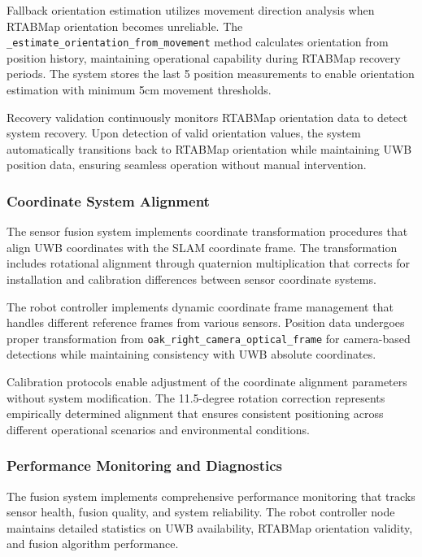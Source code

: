 Fallback orientation estimation utilizes movement direction analysis when RTABMap orientation becomes unreliable. The \texttt{\_estimate\_orientation\_from\_movement} method calculates orientation from position history, maintaining operational capability during RTABMap recovery periods. The system stores the last 5 position measurements to enable orientation estimation with minimum 5cm movement thresholds.

Recovery validation continuously monitors RTABMap orientation data to detect system recovery. Upon detection of valid orientation values, the system automatically transitions back to RTABMap orientation while maintaining UWB position data, ensuring seamless operation without manual intervention.

\subsubsection{Coordinate System Alignment}

The sensor fusion system implements coordinate transformation procedures that align UWB coordinates with the SLAM coordinate frame. The transformation includes rotational alignment through quaternion multiplication that corrects for installation and calibration differences between sensor coordinate systems.

The robot controller implements dynamic coordinate frame management that handles different reference frames from various sensors. Position data undergoes proper transformation from \texttt{oak\_right\_camera\_optical\_frame} for camera-based detections while maintaining consistency with UWB absolute coordinates.

Calibration protocols enable adjustment of the coordinate alignment parameters without system modification. The 11.5-degree rotation correction represents empirically determined alignment that ensures consistent positioning across different operational scenarios and environmental conditions.

\subsubsection{Performance Monitoring and Diagnostics}

The fusion system implements comprehensive performance monitoring that tracks sensor health, fusion quality, and system reliability. The robot controller node maintains detailed statistics on UWB availability, RTABMap orientation validity, and fusion algorithm performance.

